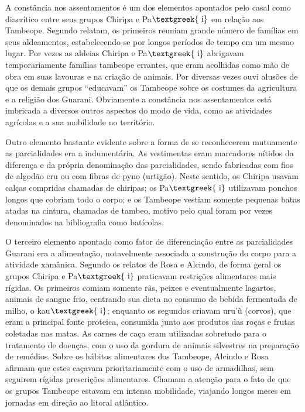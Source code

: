 \documentclass{article}
\begin{document}
A const\^ancia nos assentamentos \'e um dos elementos apontados pelo
casal como diacr\'itico entre seus grupos Chiripa e
Pa$\text{\textgreek{~i}}$ em rela\c{c}\~ao aos Tambeope. Segundo
relatam, os primeiros reuniam grande n\'umero de fam\'ilias em seus
aldeamentos, estabelecendo-se por longos per\'iodos de tempo em um
mesmo lugar. Por vezes as aldeias Chiripa e Pa$\text{\textgreek{~i}}$
abrigavam temporariamente fam\'ilias tambeope errantes, que eram
acolhidas como m\~ao de obra em suas lavouras e na cria\c{c}\~ao de
animais. Por diversas vezes ouvi alus\~oes de que os demais grupos
{\textquotedblleft}educavam{\textquotedblright} os Tambeope sobre os
costumes da agricultura e a religi\~ao dos Guarani. Obviamente a
const\^ancia nos assentamentos est\'a imbricada a diversos outros
aspectos do modo de vida, como as atividades agr\'icolas e a sua
mobilidade no territ\'orio.

Outro elemento bastante evidente sobre a forma de se reconhecerem
mutuamente as parcialidades era a indument\'aria. As vestimentas eram
marcadores n\'itidos da diferen\c{c}a e da pr\'opria denomina\c{c}\~ao
das parcialidades, sendo fabricadas com fios de algod\~ao cru ou com
fibras de pyno (urtig\~ao). Neste sentido, os Chiripa usavam cal\c{c}as
compridas chamadas de chiripas; os Pa$\text{\textgreek{~i}}$ utilizavam
ponchos longos que cobriam todo o corpo; e os Tambeope vestiam somente
pequenas batas atadas na cintura, chamadas de tambeo, motivo pelo qual
foram por vezes denominados na bibliografia como bat\'icolas.

O terceiro elemento apontado como fator de diferencia\c{c}\~ao entre as
parcialidades Guarani era a alimenta\c{c}\~ao, notavelmente associada a
constru\c{c}\~ao do corpo para a atividade xam\^anica. Segundo os
relatos de Rosa e Alcindo, de forma geral os grupos Chiripa e
Pa$\text{\textgreek{~i}}$ praticavam restri\c{c}\~oes alimentares mais
r\'igidas. Os primeiros comiam somente r\~as, peixes e eventualmente
lagartos, animais de sangue frio, centrando sua dieta no consumo de
bebida fermentada de milho, o kau$\text{\textgreek{~i}}$; enquanto os
segundos criavam uru{\textquoteright}\~u (corvos), que eram a principal
fonte proteica, consumida junto aos produtos das ro\c{c}as e frutas
coletadas nas matas. As carnes de ca\c{c}a eram utilizadas sobretudo
para o tratamento de doen\c{c}as, com o uso da gordura de animais
silvestres na prepara\c{c}\~ao de rem\'edios. Sobre os h\'abitos
alimentares dos Tambeope, Alcindo e Rosa afirmam que estes ca\c{c}avam
prioritariamente com o uso de armadilhas, sem seguirem r\'igidas
prescri\c{c}\~oes alimentares. Chamam a aten\c{c}\~ao para o fato de
que os grupos Tambeope estavam em intensa mobilidade, viajando longos
meses em jornadas em dire\c{c}\~ao ao litoral atl\^antico. 
\end{document}
